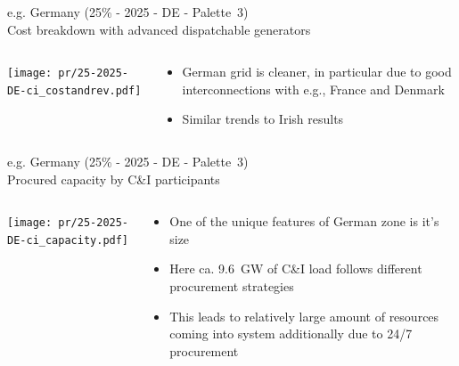 \begin{frame}{e.g. Germany (25\% - 2025 - DE - Palette~3) 
\\ Cost breakdown with advanced dispatchable generators}

\begin{columns}[T]
\begin{column}{9cm}
\centering

\texttt{[image: pr/25-2025-DE-ci\_costandrev.pdf]}
\end{column}
\begin{column}{5cm}

  \begin{itemize}
  \item German grid is cleaner, in particular due to good interconnections with e.g., France and Denmark
  \item Similar trends to Irish results
  \end{itemize}
  
\end{column}
\end{columns}

\end{frame}


\begin{frame}{e.g. Germany (25\% - 2025 - DE - Palette~3) 
\\ Procured capacity by C\&I participants}

\begin{columns}[T]
\begin{column}{9cm}
\centering

\texttt{[image: pr/25-2025-DE-ci\_capacity.pdf]}
\end{column}
\begin{column}{5cm}

  \begin{itemize}
  \item  One of the unique features of German zone is it's size
  \item Here ca. \alert{9.6~GW} of C\&I load follows different procurement strategies
  \item This leads to relatively \alert{large amount of resources coming into system additionally} due to 24/7 procurement
  \end{itemize}
  
\end{column}
\end{columns}

\end{frame}



